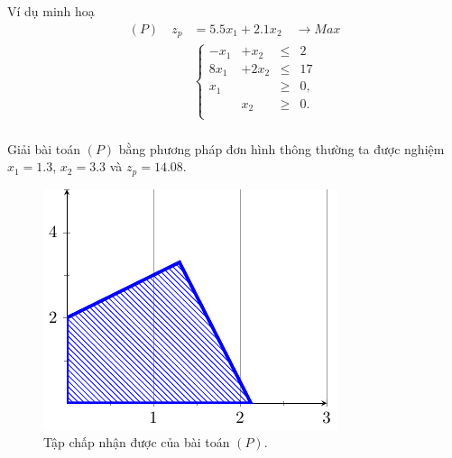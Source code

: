 \documentclass[10pt]{beamer}
\begin{document}
\begin{frame}{Ví dụ minh hoạ}
    \begin{equation*}
        \begin{split}
            (P) \quad z_p&= 5.5x_1 + 2.1x_2 \quad \longrightarrow Max \\
            & \left\{\begin{array}{cccc}
            -x_1 &+ x_2 &\leq& 2 \\
            8x_1 &+ 2x_2 &\leq& 17 \\
            x_1 &&\geq& 0,\\
            &x_2 &\geq& 0. \\
            \end{array}\right. \\
        \end{split}
    \end{equation*}
\end{frame}

\begin{frame}
    Giải bài toán $(P)$ bằng phương pháp đơn hình thông thường ta được nghiệm $x_1 =1.3$, $x_2 = 3.3$ và $z_p=14.08$.
    \vspace{0.5cm}
\begin{figure}[h]
    \centering
    \includegraphics[width=0.4\linewidth]{hinh1.pdf}
    \caption{Tập chấp nhận được của bài toán $(P)$.}
\end{figure}
\end{frame}
\end{document}
